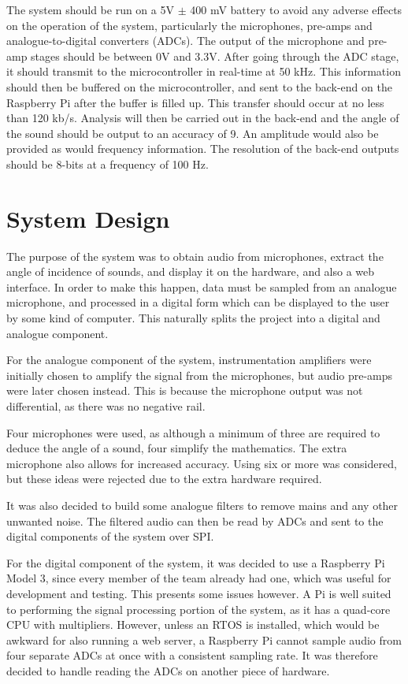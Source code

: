 \documentclass[a4paper]{article}
\begin{document}
The system should be run on a 5V $\pm$ 400 mV battery to avoid any adverse effects on the operation of the system,
particularly the microphones, pre-amps and analogue-to-digital converters (ADCs).
The output of the microphone and pre-amp stages should be between 0V and 3.3V.
After going through the ADC stage, it should transmit to the microcontroller in
real-time at 50 kHz. This information should then be buffered on the
microcontroller, and sent to the back-end on the Raspberry Pi after the buffer is filled up. This transfer should occur at no less
than 120 kb/s. Analysis will then be carried out in the back-end and the angle of
the sound should be output to an accuracy of 9\textdegree. An amplitude would also be
provided as would frequency information. The resolution of the back-end outputs
should be 8-bits at a frequency of 100 Hz.


\section{System Design}

The purpose of the system was to obtain audio from microphones, extract the
angle of incidence of sounds, and display it on the hardware, and also a web
interface. In order to make this happen, data must be sampled from an analogue
microphone, and processed in a digital form which can be displayed to the user
by some kind of computer. This naturally splits the project into a digital and
analogue component.

For the analogue component of the system, instrumentation amplifiers were
initially chosen to amplify the signal from the microphones, but audio
pre-amps were later chosen instead. This is because the microphone output was not
differential, as there was no negative rail.

Four microphones were used, as although a minimum of three are required to deduce the angle
of a sound, four simplify the mathematics. The extra microphone also allows for increased accuracy. Using six or
more was considered, but these ideas were rejected due to the extra hardware
required.

It was also decided to build some analogue filters to remove mains and any other
unwanted noise.  The filtered audio can then be read by ADCs and sent to the
digital components of the system over SPI.

For the digital component of the system, it was decided to use a Raspberry Pi
Model 3, since every member of the team already had one, which was useful for development and testing. This presents some issues
however. A Pi is well suited to performing the signal processing portion of the
system, as it has a quad-core CPU with multipliers.  However, unless an RTOS is
installed, which would be awkward for also running a web server, a
Raspberry Pi cannot sample audio from four separate ADCs at once with a
consistent sampling rate. It was therefore decided to handle reading the
ADCs on another piece of hardware.
\end{document}

